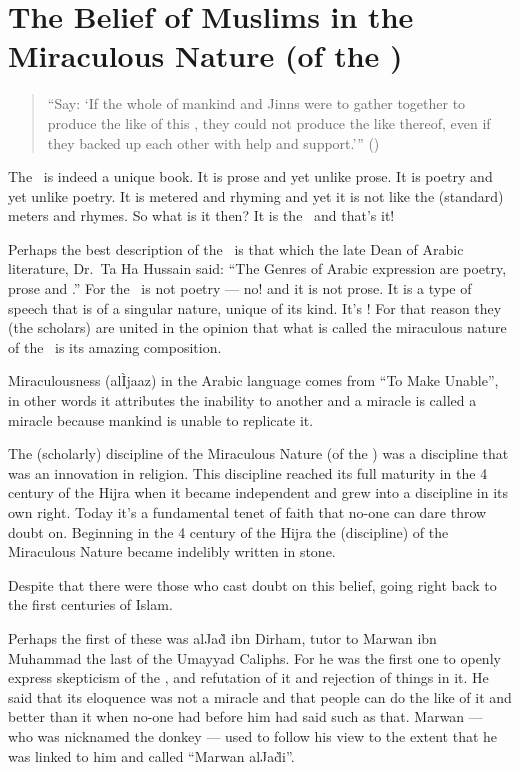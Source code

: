 \documentclass[12pt]{memoir}
\begin{document}
\section{The Belief of Muslims in the Miraculous Nature (of the \Quran)}

\begin{quote}
“Say: ‘If the whole of mankind and Jinns were to gather together
to produce the like of this \Quran, they could not produce the like thereof,
even if they backed up each other with help and support.’” ()
\end{quote}

The \Quran\ is indeed a unique book. It is prose and yet unlike prose. It is
poetry and yet unlike poetry. It is metered and rhyming and yet it is not like
the (standard) meters and rhymes. So what is it then? It is the \Quran\ and
that’s it!

Perhaps the best description of the \Quran\ is that which the late Dean of
Arabic literature, Dr.\ Ta Ha Hussain said: “The Genres of Arabic expression
are poetry, prose and \Quran.” For the \Quran\ is not poetry — no! and it is not
prose. It is a type of speech that is of a singular nature, unique of its kind.
It’s \Quran! For that reason they (the scholars) are united in the opinion that
what is called the miraculous nature of the \Quran\ is its amazing composition.

Miraculousness (al\–\`Ijaaz) in the Arabic language
comes from “To Make Unable”,
in other words it attributes the inability to another
and a miracle is called a miracle
because mankind is unable to replicate it.

The (scholarly) discipline of the Miraculous Nature (of the \Quran) was a
discipline that was an innovation in religion.
This discipline reached its full
maturity in the 4 century of the Hijra
when it became independent and grew
into a discipline in its own right.
Today it’s a fundamental tenet of faith
that no-one can dare throw doubt on.
Beginning in the 4 century of the Hijra
the (discipline) of the Miraculous Nature became indelibly written in stone.

Despite that there were those who cast doubt on this belief, going right back
to the first centuries of Islam.

Perhaps the first of these was al\–Ja\`d ibn Dirham,
tutor to Marwan ibn Muhammad the last of the Umayyad Caliphs.
For he was the first one to openly express
skepticism of the \Quran, and refutation of it and rejection of things in it.
He said that its eloquence was not a miracle and that people can do the like of
it and better than it when no-one had before him had said such as that. Marwan
— who was nicknamed the donkey — used to follow his view to the extent that he
was linked to him and called “Marwan al\–Ja\`di”\fnmark.
\end{document}
